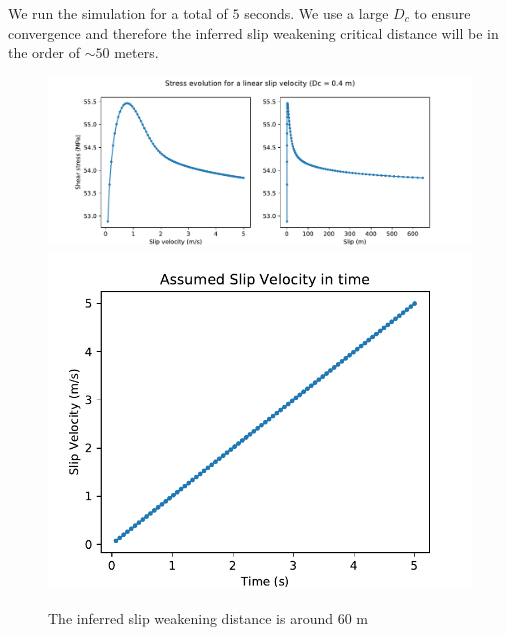 \documentclass[11pt]{article}
\begin{document}
We run the simulation for a total of $5$ seconds. We use a large $D_c$ to ensure convergence and therefore the inferred slip weakening critical distance will be in the order of $\sim 50$ meters.

\begin{figure}[!htb]
    \centering
    \includegraphics[scale=0.6]{fig1.pdf}
    \includegraphics[scale=0.5]{fig1_v.pdf}
    \caption{The inferred slip weakening distance is around 60 m}
\end{figure}
\pagebreak
\end{document}

